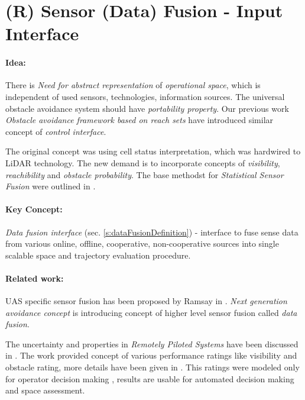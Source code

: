 \section{(R) Sensor (Data) Fusion - Input Interface}\label{s:dataFusionProbabilisticModelTheory}
\paragraph{Idea:}  There is \emph{Need for abstract representation} of \emph{operational space}, which is independent of used sensors, technologies, information sources. The universal obstacle avoidance system should have \emph{portability property}. Our previous work \emph{Obstacle avoidance framework based on reach sets} \cite{gomola2017obstacle} have introduced similar concept of \emph{control interface}.

The original concept was using cell status interpretation, which was hardwired to LiDAR technology.  The new demand is to incorporate concepts of \emph{visibility}, \emph{reachibility} and \emph{obstacle probability}. The base methodst for \emph{Statistical Sensor Fusion} were outlined in \cite{gustafsson2010statistical}.

\paragraph{Key Concept:} \emph{Data fusion interface} (sec. \ref{s:dataFusionDefinition}) - interface to fuse sense data from various online, offline, cooperative, non-cooperative sources into single scalable {space and trajectory evaluation procedure}.
    
\paragraph{Related work:} \noindent UAS specific sensor fusion has been proposed by Ramsay in \cite{ramasamy2014avionics}. \emph{Next generation avoidance concept} \cite{ramasamy2014next} is introducing concept of higher level sensor fusion called \emph{data fusion}. 

The uncertainty and properties in \emph{Remotely Piloted Systems} have been discussed in \cite{chynchenko2016remotely}. The work provided concept of various performance ratings like visibility and obstacle rating, more details have been given in \cite{shmelova2016modeling}. This ratings were modeled only for operator decision making \cite{kharchenko2017modelling}, results are usable for automated decision making and space assessment. 


